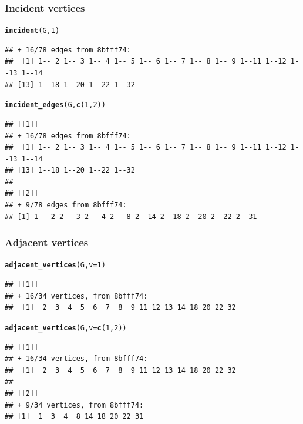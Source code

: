\documentclass[aspectratio=169]{beamer}\usepackage[]{graphicx}\usepackage[]{xcolor}
\makeatletter
\newcommand{\hlnum}[1]{\textcolor[rgb]{0.686,0.059,0.569}{#1}}%
\newcommand{\hldef}[1]{\textcolor[rgb]{0.345,0.345,0.345}{#1}}%
\newcommand{\hlkwc}[1]{\textcolor[rgb]{0.333,0.667,0.333}{#1}}%
\newcommand{\hlkwd}[1]{\textcolor[rgb]{0.737,0.353,0.396}{\textbf{#1}}}%
\newenvironment{kframe}{%
 \def\at@end@of@kframe{}%
 \ifinner\ifhmode%
  \def\at@end@of@kframe{\end{minipage}}%
  \begin{minipage}{\columnwidth}%
 \fi\fi%
 \def\FrameCommand##1{\hskip\@totalleftmargin \hskip-\fboxsep
 \colorbox{shadecolor}{##1}\hskip-\fboxsep
     \hskip-\linewidth \hskip-\@totalleftmargin \hskip\columnwidth}%
 \MakeFramed {\advance\hsize-\width
   \@totalleftmargin\z@ \linewidth\hsize
   \@setminipage}}%
 {\par\unskip\endMakeFramed%
 \at@end@of@kframe}
\newenvironment{knitrout}{}{} %
\makeatother
\begin{document}
\begin{frame}[fragile]\frametitle{Incident vertices}
\begin{knitrout}
\color{fgcolor}\begin{kframe}
\begin{alltt}
\hlkwd{incident}\hldef{(G,} \hlnum{1}\hldef{)}
\end{alltt}
\begin{verbatim}
## + 16/78 edges from 8bfff74:
##  [1] 1-- 2 1-- 3 1-- 4 1-- 5 1-- 6 1-- 7 1-- 8 1-- 9 1--11 1--12 1--13 1--14
## [13] 1--18 1--20 1--22 1--32
\end{verbatim}
\begin{alltt}
\hlkwd{incident_edges}\hldef{(G,} \hlkwd{c}\hldef{(}\hlnum{1}\hldef{,} \hlnum{2}\hldef{))}
\end{alltt}
\begin{verbatim}
## [[1]]
## + 16/78 edges from 8bfff74:
##  [1] 1-- 2 1-- 3 1-- 4 1-- 5 1-- 6 1-- 7 1-- 8 1-- 9 1--11 1--12 1--13 1--14
## [13] 1--18 1--20 1--22 1--32
## 
## [[2]]
## + 9/78 edges from 8bfff74:
## [1] 1-- 2 2-- 3 2-- 4 2-- 8 2--14 2--18 2--20 2--22 2--31
\end{verbatim}
\end{kframe}
\end{knitrout}
\end{frame}

\begin{frame}[fragile]\frametitle{Adjacent vertices}
\begin{knitrout}
\color{fgcolor}\begin{kframe}
\begin{alltt}
\hlkwd{adjacent_vertices}\hldef{(G,} \hlkwc{v} \hldef{=} \hlnum{1}\hldef{)}
\end{alltt}
\begin{verbatim}
## [[1]]
## + 16/34 vertices, from 8bfff74:
##  [1]  2  3  4  5  6  7  8  9 11 12 13 14 18 20 22 32
\end{verbatim}
\begin{alltt}
\hlkwd{adjacent_vertices}\hldef{(G,} \hlkwc{v} \hldef{=} \hlkwd{c}\hldef{(}\hlnum{1}\hldef{,} \hlnum{2}\hldef{))}
\end{alltt}
\begin{verbatim}
## [[1]]
## + 16/34 vertices, from 8bfff74:
##  [1]  2  3  4  5  6  7  8  9 11 12 13 14 18 20 22 32
## 
## [[2]]
## + 9/34 vertices, from 8bfff74:
## [1]  1  3  4  8 14 18 20 22 31
\end{verbatim}
\end{kframe}
\end{knitrout}
\end{frame}
\end{document}
